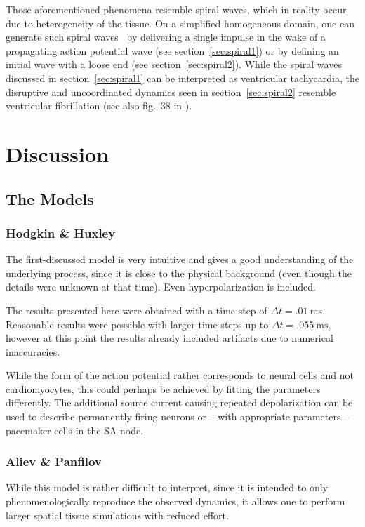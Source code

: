 Those aforementioned phenomena resemble spiral waves, which in reality occur
due to heterogeneity of the tissue. On a simplified homogeneous domain, one can
generate such spiral waves \eg~by delivering a single impulse in the wake of a
propagating action potential wave (see section~\ref{sec:spiral1}) or by
defining an initial wave with a loose end (see section~\ref{sec:spiral2}).
While the spiral waves discussed in section~\ref{sec:spiral1} can be
interpreted as ventricular tachycardia, the disruptive and uncoordinated
dynamics seen in section~\ref{sec:spiral2} resemble ventricular fibrillation
(see also fig.~38 in \cite{Cherry2008}).


\section{Discussion}
\subsection{The Models}
\subsubsection{Hodgkin \& Huxley}
The first-discussed model is very intuitive and gives a good understanding of
the underlying process, since it is close to the physical background (even
though the details were unknown at that time). Even hyperpolarization is
included.

The results presented here were obtained with a time step of
$\Delta{t}=\SI{.01}{\milli\second}$. Reasonable results were possible with
larger time steps up to $\Delta{t}=\SI{.055}{\milli\second}$, however at this
point the results already included artifacts due to numerical inaccuracies.

While the form of the action potential rather corresponds to neural cells and
not cardiomyocytes, this could perhaps be achieved by fitting the parameters
differently. The additional source current causing repeated depolarization
can be used to describe permanently firing neurons or -- with
appropriate parameters -- pacemaker cells in the SA node.

\subsubsection{Aliev \& Panfilov}
While this model is rather difficult to interpret, since it is intended to
only phenomenologically reproduce the observed dynamics, it allows one to
perform larger spatial tissue simulations with reduced effort.

